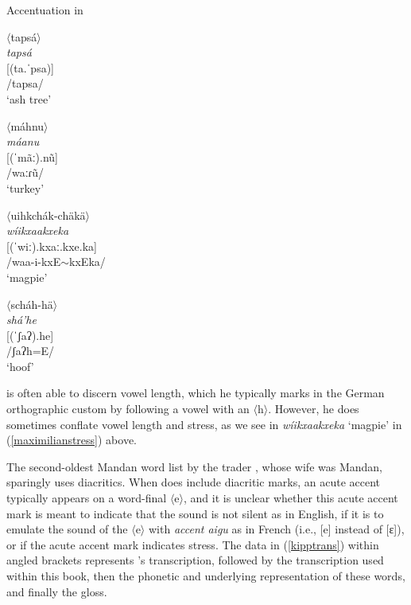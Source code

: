 \begin{exe}
\item\label{maximilianstress} Accentuation in \citet{maximilian1839}

\begin{xlist}
\item $\langle$tapsá$\rangle$\\
	\textit{tapsá}\\
	{[}(ta.ˈpsa)]\\
        /tapsa/\\
	`ash tree'

\item $\langle$máhnu$\rangle$\\
    \textit{máanu}\\
    {[}(ˈmãː).nũ]\\
    /waːɾũ/\\
    `turkey'



\item $\langle$uihkchák-chäkä$\rangle$\\
	\textit{wíikxaakxeka}\\
	{[}(ˈwiː).kxaː.kxe.ka]\\
        /waa-i-kxE$\sim$kxEka/\\
	`magpie'

\item $\langle$scháh-hä$\rangle$\\
	\textit{shá'he}\\
	{[}(ˈʃaʔ).he]\\
        /ʃaʔh=E/\\
        `hoof'
\end{xlist}

\end{exe}

\citet{maximilian1839} is often able to discern vowel length, which he typically marks in the German orthographic custom by following a vowel with an $\langle$h$\rangle$. However, he does sometimes conflate vowel length and stress, as we see in \textit{wíikxaakxeka} `magpie' in (\ref{maximilianstress}) above.

The second-oldest Mandan word list by the trader \citet{kipp1852}, whose wife was Mandan, sparingly uses diacritics. When \citeauthor{kipp1852} does include diacritic marks, an acute accent typically appears on a word-final $\langle$e$\rangle$, and it is unclear whether this acute accent mark is meant to indicate that the sound is not silent as in English, if it is to emulate the sound of the $\langle$e$\rangle$ with \textit{accent aigu} as in French (i.e., [e] instead of [ɛ]), or if the acute accent mark indicates stress. The data in (\ref{kipptrans}) within angled brackets represents \citeauthor{kipp1852}'s transcription, followed by the transcription used within this book, then the phonetic and underlying representation of these words, and finally the gloss.

